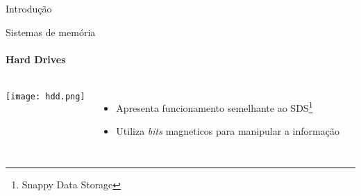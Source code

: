 \begin{frame}[c]{Introdução} 
    \transdissolve[duration=0.5]
   
    \begin{center}
    \end{center}
    
   
\end{frame}

\begin{frame}[t]{Sistemas de memória}
    \transboxout[duration=0.5]
    \framesubtitle{Hard Drives}
    \begin{columns}
            \texttt{[image: hdd.png]}
            \begin{itemize}
                \item Apresenta funcionamento semelhante ao SDS\footnote{Snappy Data Storage}
                \item Utiliza \textit{bits} magneticos para manipular a informação
            
            \end{itemize}
    \end{columns}
   
\end{frame}

